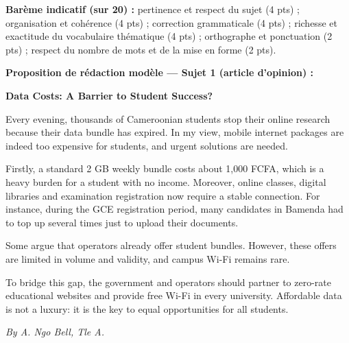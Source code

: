 \documentclass[11pt]{article}
\begin{document}
\begin{corrige}
\textbf{Barème indicatif (sur 20) :} pertinence et respect du sujet (4 pts) ; organisation et cohérence (4 pts) ; correction grammaticale (4 pts) ; richesse et exactitude du vocabulaire thématique (4 pts) ; orthographe et ponctuation (2 pts) ; respect du nombre de mots et de la mise en forme (2 pts).

\textbf{Proposition de rédaction modèle — Sujet 1 (article d'opinion) :}
\begin{textebox}
\textbf{Data Costs: A Barrier to Student Success?}

Every evening, thousands of Cameroonian students stop their online research because their data bundle has expired. In my view, mobile internet packages are indeed too expensive for students, and urgent solutions are needed.

Firstly, a standard 2 GB weekly bundle costs about 1,000 FCFA, which is a heavy burden for a student with no income. Moreover, online classes, digital libraries and examination registration now require a stable connection. For instance, during the GCE registration period, many candidates in Bamenda had to top up several times just to upload their documents.

Some argue that operators already offer student bundles. However, these offers are limited in volume and validity, and campus Wi-Fi remains rare.

To bridge this gap, the government and operators should partner to zero-rate educational websites and provide free Wi-Fi in every university. Affordable data is not a luxury: it is the key to equal opportunities for all students.

\emph{By A. Ngo Bell, Tle A.}
\end{textebox}


\end{corrige}
\end{document}
